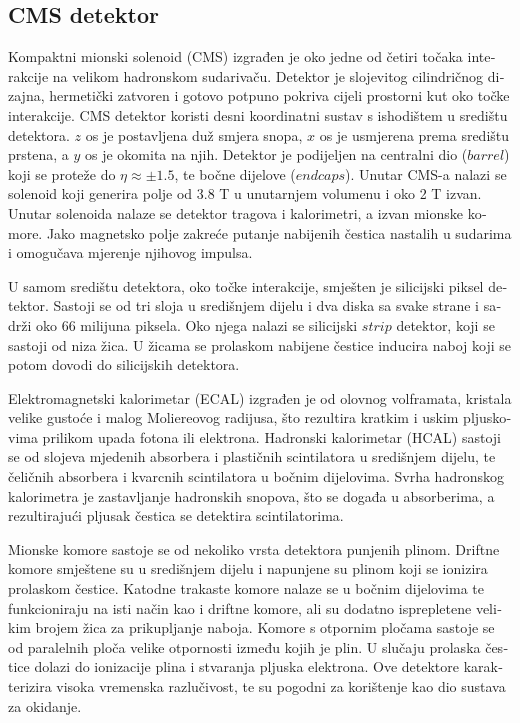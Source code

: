 \begin{otherlanguage}{croatian}
\section{CMS detektor}
Kompaktni mionski solenoid (CMS) izgrađen je oko jedne od četiri točaka interakcije na velikom hadronskom sudarivaču. Detektor je slojevitog cilindričnog dizajna, hermetički zatvoren i gotovo potpuno pokriva cijeli prostorni kut oko točke interakcije. CMS detektor koristi desni koordinatni sustav s ishodištem u središtu detektora. $z$ os je postavljena duž smjera snopa, $x$ os je usmjerena prema središtu prstena, a $y$ os je okomita na njih. Detektor je podijeljen na centralni dio ($barrel$) koji se proteže do $\eta \approx \pm 1.5$, te bočne dijelove ($endcaps$). Unutar CMS-a nalazi se solenoid koji generira polje od 3.8 T u unutarnjem volumenu i oko 2 T izvan.  Unutar solenoida nalaze se detektor tragova i kalorimetri, a izvan mionske komore. Jako magnetsko polje zakreće putanje nabijenih čestica nastalih u sudarima i omogučava mjerenje njihovog impulsa. 
\par U samom središtu detektora, oko točke interakcije, smješten je silicijski piksel detektor. Sastoji se od tri sloja u središnjem dijelu i dva diska sa svake strane i sadrži oko 66 milijuna piksela. Oko njega nalazi se silicijski $strip$ detektor, koji se sastoji od niza žica. U žicama se prolaskom nabijene čestice inducira naboj koji se potom dovodi do silicijskih detektora. 
\par Elektromagnetski kalorimetar (ECAL) izgrađen je od olovnog volframata, kristala velike gustoće i malog Moliereovog radijusa, što rezultira kratkim i uskim pljuskovima prilikom upada fotona ili elektrona. Hadronski kalorimetar (HCAL) sastoji se od slojeva mjedenih absorbera i plastičnih scintilatora u središnjem dijelu, te čeličnih absorbera i kvarcnih scintilatora u bočnim dijelovima. Svrha hadronskog kalorimetra je zastavljanje hadronskih snopova, što se događa u absorberima, a rezultirajući pljusak čestica se detektira scintilatorima. 
\par Mionske komore sastoje se od nekoliko vrsta detektora punjenih plinom. Driftne komore smještene su u središnjem dijelu i napunjene su plinom koji se ionizira prolaskom čestice. Katodne trakaste komore nalaze se u bočnim dijelovima te funkcioniraju na isti način kao i driftne komore, ali su dodatno isprepletene velikim brojem žica za prikupljanje naboja. Komore s otpornim pločama sastoje se od paralelnih ploča velike otpornosti između kojih je plin. U slučaju prolaska čestice dolazi do ionizacije plina i stvaranja pljuska elektrona. Ove detektore karakterizira visoka vremenska razlučivost, te su pogodni za korištenje kao dio sustava za okidanje. 

\end{otherlanguage}
